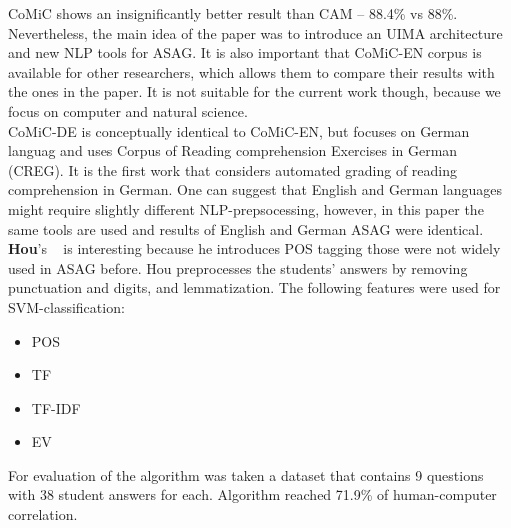 CoMiC shows an insignificantly better result than CAM -- 88.4\% vs 88\%. Nevertheless, the main idea of the paper was to introduce an UIMA architecture and new NLP tools for ASAG. It is also important that CoMiC-EN corpus is available for other researchers, which allows them to compare their results with the ones in the paper. It is not suitable for the current work though, because we focus on computer and natural science.\\

CoMiC-DE is conceptually identical to CoMiC-EN, but focuses on German languag and uses Corpus of Reading comprehension Exercises
in German (CREG). It is the first work that considers automated grading of reading comprehension in German. One can suggest that English and German languages might require slightly different NLP-prepsocessing, however, in this paper the same tools are used and results of English and German ASAG were identical.\\

\textbf{Hou}'s ~\cite{Hou} is interesting because he introduces POS tagging those were not widely used in ASAG before. Hou preprocesses the students' answers by removing punctuation and digits, and lemmatization. The following features were used for SVM-classification:
\begin{itemize}
\item POS
\item TF
\item TF-IDF
\item EV
\end{itemize} 
For evaluation of the algorithm was taken a dataset that contains 9 questions with 38 student answers for each. Algorithm reached 71.9\% of human-computer correlation.

